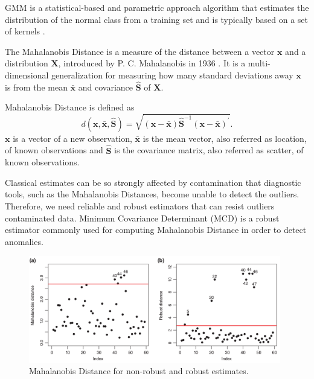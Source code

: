 \documentclass[review]{elsarticle}
\begin{document}
GMM is a statistical-based and parametric approach algorithm that estimates the distribution of the normal class from a training set and is typically based on a set of kernels \cite{moustafa2019holistic}.

The Mahalanobis Distance is a measure of the distance between a vector $\boldsymbol{x}$ and a distribution $\boldsymbol{X}$, introduced by P. C. Mahalanobis in 1936 \cite{mahalanobis1936generalized}. It is a multi-dimensional generalization for measuring how many standard deviations away $\boldsymbol{x}$ is from the mean $\boldsymbol{\bar{x}}$ and covariance $\boldsymbol{\hat{S}}$ of $\boldsymbol{X}$.

Mahalanobis Distance is defined as		
	\begin{equation}\label{eq:eq01}
		d(\boldsymbol{x},\bar{\boldsymbol{x}}, \boldsymbol{\hat{S}}) = \sqrt{(\boldsymbol{x} - \bar{\boldsymbol{x}}) \boldsymbol{\hat{S}}^{-1}(\boldsymbol{x} - \bar{\boldsymbol{x}})^\prime}.
	\end{equation}
$\boldsymbol{x}$ is a vector of a new observation, $\bar{\boldsymbol{x}}$ is the mean vector, also referred as location, of known observations and $\boldsymbol{\hat{S}}$ is the covariance matrix, also referred as scatter, of known observations.

Classical estimates can be so strongly affected by contamination that diagnostic tools, such as the Mahalanobis Distances, become unable to detect the outliers. Therefore, we need reliable and robust estimators that can resist outliers contaminated data. Minimum Covariance Determinant (MCD) \cite{rousseeuw1984least} is a robust estimator commonly used for computing Mahalanobis Distance in order to detect anomalies.

\begin{figure}[h!]
     \centering
     \includegraphics[width=11cm]{figures/mahalanobis_robust.png}
     \caption{Mahalanobis Distance for non-robust and robust estimates.}
     \label{fig:fig04}
\end{figure}
\end{document}
